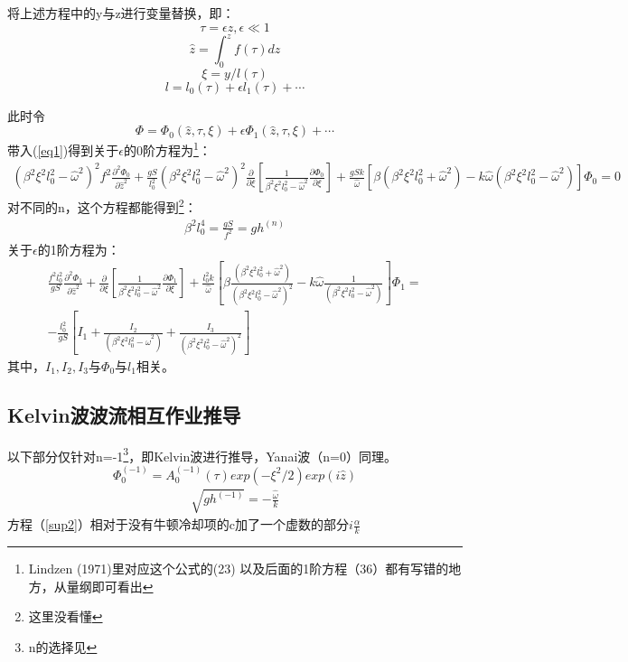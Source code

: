 \documentclass[UTF8]{ctexart}
\begin{document}
	将上述方程中的y与z进行变量替换，即：
	\[\tau=\epsilon z, \epsilon\ll1\]
	\[\widehat{z}=\int_0^zf(\tau)dz\]
	\[\xi=y/l(\tau)\]
	\[l=l_0(\tau)+\epsilon l_1(\tau)+\cdots\]
	
	此时令
	\[\Phi=\Phi_0(\widehat{z},\tau,\xi)+\epsilon\Phi_1(\widehat{z},\tau,\xi)+\cdots\]
	带入(\ref{eq1})得到关于$\epsilon$的0阶方程为\footnote{Lindzen (1971)\cite{deduct}里对应这个公式的(23)
		以及后面的1阶方程（36）都有写错的地方，从量纲即可看出}：
	\begin{align} \label{eq2}
	(\beta^2\xi^2l_0^2-{\widehat{\omega}}^2)^2f^2\frac{\partial^2\Phi_0}{\partial \widehat{z}^2}+\frac{gS}{l_0^2}
	(\beta^2\xi^2l_0^2-{\widehat{\omega}}^2)^2\frac{\partial}{\partial\xi}[\frac{1}{\beta^2\xi^2l_0^2-
	{\widehat{\omega}}^2}\frac{\partial\Phi_0}{\partial\xi}]+\frac{gSk}{\widehat{\omega}}[\beta(\beta^2\xi
	^2l_0^2+{\widehat{\omega}}^2)-k\widehat{\omega}(\beta^2\xi^2l_0^2-{\widehat{\omega}}^2)]\Phi_0=0
	\end{align}
	对不同的n，这个方程都能得到\footnote{这里没看懂}：
	\begin{align}\label{sup}
	\beta^2l_0^4=\frac{gS}{f^2}=gh^{(n)}
	\end{align}
	关于$\epsilon$的1阶方程为：
	\begin{align} \label{eq3}
	\nonumber\frac{f^2l_0^2}{gS}\frac{\partial^2\Phi_1}{\partial \widehat{z}^2}+
	\frac{\partial}{\partial\xi}[\frac{1}{\beta^2\xi^2l_0^2-{\widehat{\omega}}^2}
	\frac{\partial\Phi_1}{\partial\xi}]+\frac{l_0^2k}{\widehat{\omega}}[\beta\frac{(\beta^2\xi
	^2l_0^2+{\widehat{\omega}}^2)}{(\beta^2\xi^2l_0^2-{\widehat{\omega}}^2)^2}-k\widehat{\omega}
	\frac{1}{(\beta^2\xi^2l_0^2-{\widehat{\omega}}^2)}]\Phi_1=\\
	-\frac{l_0^2}{gS}[I_1+\frac{I_2}{(\beta^2\xi^2l_0^2-{\widehat{\omega}}^2)}+\frac{I_3}
	{(\beta^2\xi^2l_0^2-{\widehat{\omega}}^2)^2}]
	\end{align}	
	其中，$I_1,I_2,I_3$与$\Phi_0$与$l_1$相关。
	\subsection{Kelvin波波流相互作业推导}
	以下部分仅针对n=-1\footnote{n的选择见\cite{n}}，即Kelvin波进行推导，Yanai波（n=0）同理。
	\[\Phi_0^{(-1)}=A_0^{(-1)}(\tau)exp(-\xi^2/2)exp(i\widehat{z})\]
	\begin{align}\label{sup2}
		\sqrt{gh^{(-1)}}=-\frac{\widehat{\omega}}{k}
	\end{align}
	方程（\ref{sup2}）相对于没有牛顿冷却项的c加了一个虚数的部分$i\frac{\alpha}{k}$
	
\end{document}
